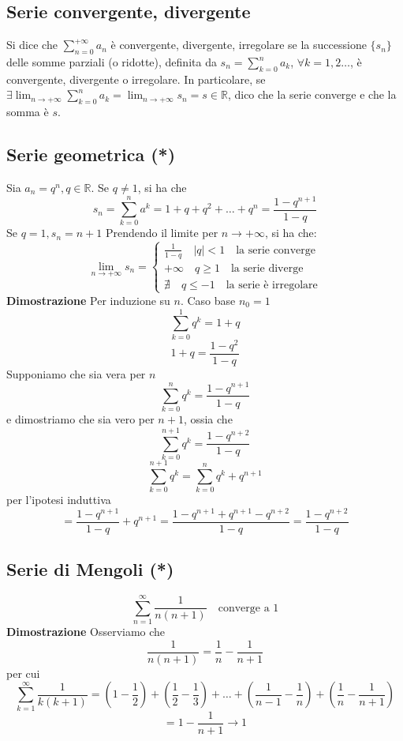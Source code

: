 \documentclass[12pt]{article}
\begin{document}
\subsection{Serie convergente, divergente}
Si dice che $\displaystyle \sum_{n=0}^{+\infty} a_n$ è convergente, divergente, irregolare se la successione $\{ s_n \}$ delle somme parziali (o ridotte), definita da $s_n = \sum_{k=0}^n a_k$, $\forall k = 1, 2 \dots$, è convergente, divergente o irregolare. In particolare, se $\displaystyle \exists \lim_{n \to +\infty} \sum_{k=0}^n a_k = \lim_{n \to +\infty} s_n = s \in \mathbb{R}$, dico che la serie converge e che la somma è $s$.

\subsection{Serie geometrica (*)}
Sia \(a_n = q^n, q \in \mathbb{R}\). Se \(q \neq 1\), si ha che
\[ s_n =  \sum_{k=0}^n a^k = 1 + q + q^2 + \dots + q^n = \frac{1-q^{n+1}}{1-q}\]
Se \(q=1, s_n = n+1\)
Prendendo il limite per \(n \to +\infty\), si ha che:
\[
\lim_{n \to +\infty} s_n = 
\begin{cases}
\frac{1}{1-q} \quad |q| < 1 \quad \text{la serie converge}\\
+\infty \quad q \geq 1 \quad \text{la serie diverge}\\
\nexists \quad q \leq -1 \quad \text{la serie è irregolare}
\end{cases}
\]
\textbf{Dimostrazione}\newline
Per induzione su \(n\). Caso base \(n_0 = 1\)
\[\sum_{k=0}^1 q^k = 1+q\]
\[1+q = \frac{1-q^2}{1-q}\]
Supponiamo che sia vera per $n$
\[ \sum_{k=0}^n q^k = \frac{1-q^{n+1} }{1-q}\]
e dimostriamo che sia vero per $n+1$, ossia che
\[ \sum_{k=0}^{n+1} q^k = \frac{1-q^{n+2}}{1-q} \]
\[  \sum_{k=0}^{n+1} q^k =  \sum_{k=0}^{n} q^k + q^{n+1}\]
per l'ipotesi induttiva
\[ = \frac{1-q^{n+1}}{1-q}+q^{n+1} = \frac{1-q^{n+1}+q^{n+1}-q^{n+2}}{1-q} = \frac{1-q^{n+2}}{1-q}\]

\subsection{Serie di Mengoli (*)}
\[ \sum_{n = 1}^{\infty} \frac{1}{n(n+1)} \quad \text{converge a 1}\]
\textbf{Dimostrazione}\newline
Osserviamo che
\[ \frac{1}{n(n+1)} = \frac{1}{n} - \frac{1}{n+1}\]
per cui
\[ \sum_{k = 1}^{\infty} \frac{1}{k(k+1)} = \left(1- \frac{1}{2} \right) + \left(\frac{1}{2} - \frac{1}{3} \right) + \dots + \left( \frac{1}{n-1} - \frac{1}{n} \right) + \left( \frac{1}{n} - \frac{1}{n+1} \right) \]
\[ = 1 - \frac{1}{n+1} \to 1\]
\end{document}
